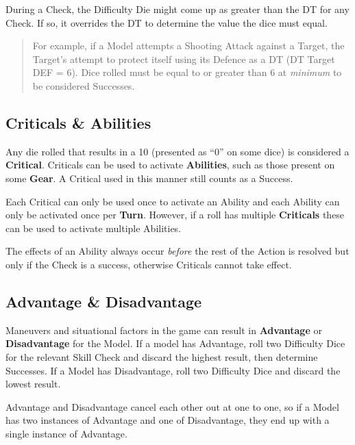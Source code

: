 \documentclass[
]{book}
\begin{document}
During a Check, the Difficulty Die might come up as greater than the DT for any Check. If so, it overrides the DT to determine the value the dice must equal. 

\begin{quote}
For example, if a Model attempts a Shooting Attack against a Target, the Target's attempt to protect itself using its Defence as a DT (DT Target DEF = 6). Dice rolled must be equal to or greater than 6 at \emph{minimum} to be considered Successes.
\end{quote}

\hypertarget{crits}{%
\subsection*{Criticals \& Abilities}\label{crits}}

Any die rolled that results in a 10 (presented as ``0'' on some dice) is considered a \textbf{Critical}. Criticals can be used to activate \textbf{Abilities}, such as those present on some \textbf{Gear}. A Critical used in this manner still counts as a Success.

Each Critical can only be used once to activate an Ability and each Ability can only be activated once per \textbf{Turn}. However, if a roll has multiple \textbf{Criticals} these can be used to activate multiple Abilities.

The effects of an Ability always occur \emph{before} the rest of the Action is resolved but only if the Check is a success, otherwise Criticals cannot take effect.

\hypertarget{adv}{%
\subsection*{Advantage \& Disadvantage}\label{adv}}

Maneuvers and situational factors in the game can result in \textbf{Advantage} or \textbf{Disadvantage} for the Model. If a model has Advantage, roll two Difficulty Dice for the relevant Skill Check and discard the highest result, then determine Successes. If a Model has Disadvantage, roll two Difficulty Dice and discard the lowest result.

Advantage and Disadvantage cancel each other out at one to one, so if a Model has two instances of Advantage and one of Disadvantage, they end up with a single instance of Advantage.
\end{document}
